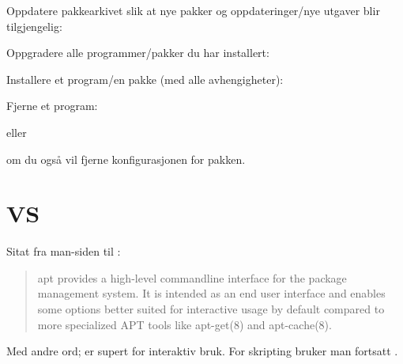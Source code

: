 Oppdatere pakkearkivet slik at nye pakker og oppdateringer/nye utgaver blir tilgjengelig:


Oppgradere alle programmer/pakker du har installert:


Installere et program/en pakke (med alle avhengigheter):


Fjerne et program:


eller 


om du også vil fjerne konfigurasjonen for pakken.

\section{ VS }

Sitat fra man-siden til :

\begin{quote}
apt provides a high-level commandline interface for the package management system. 
It is intended as an end user interface and enables some options better suited for 
interactive usage by default compared to more specialized APT tools like 
apt-get(8) and apt-cache(8).
\end{quote}

Med andre ord;  er supert for interaktiv bruk. For skripting bruker man
fortsatt .
